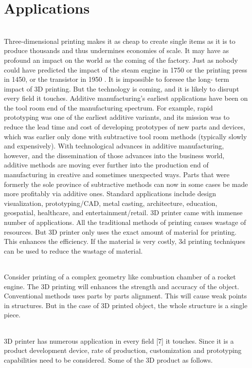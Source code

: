 \documentclass[12pt,a4paper]{report}
\begin{document}
	\chapter{Applications}
	
	\indent
	\\Three-dimensional printing makes it as cheap to create single items as it is to produce
	thousands and thus undermines economies of scale. It may have as profound an impact on the world
	as the coming of the factory. Just as nobody could have predicted the impact of the steam engine in
	1750 or the printing press in 1450, or the transistor in 1950 . It is impossible to foresee the long-
	term impact of 3D printing. But the technology is coming, and it is likely to disrupt every field it
	touches. Additive manufacturing's earliest applications have been on the tool room end of the
	manufacturing spectrum. For example, rapid prototyping was one of the earliest additive variants,
	and its mission was to reduce the lead time and cost of developing prototypes of new parts and
	devices, which was earlier only done with subtractive tool room methods (typically slowly and
	expensively). With technological advances in additive manufacturing, however, and the
	dissemination of those advances into the business world, additive methods are moving ever further
	into the production end of manufacturing in creative and sometimes unexpected ways. Parts that
	were formerly the sole province of subtractive methods can now in some cases be made more
	profitably via additive ones. Standard applications include design visualization, prototyping/CAD,
	metal casting, architecture, education, geospatial, healthcare, and entertainment/retail. 3D printer
	came with immense number of applications. All the traditional methods of printing causes wastage
	of resources. But 3D printer only uses the exact amount of material for printing. This enhances the
	efficiency. If the material is very costly, 3d printing techniques can be used to reduce the wastage of
	material.\par
	\indent
	\\Consider printing of a complex geometry like combustion chamber of a rocket engine. The
	3D printing will enhances the strength and accuracy of the object. Conventional methods uses parts
	by parts alignment. This will cause weak points in structures. But in the case of 3D printed object,
	the whole structure is a single piece.\par
	\indent
	\\3D printer has numerous application in every field [7] it touches. Since it is a product
	development device, rate of production, customization and prototyping capabilities need to be
	considered. Some of the 3D product as follows.\par
\end{document}
